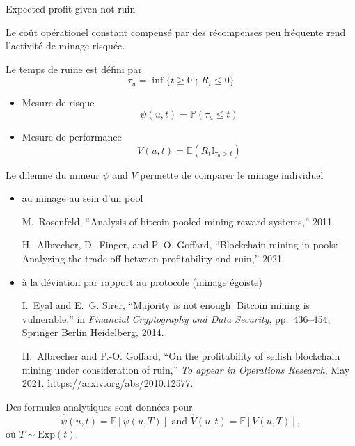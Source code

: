 \documentclass{beamer}
\begin{document}
\begin{frame}{Expected profit given not ruin}
\scriptsize

\begin{tcolorbox}[enhanced,drop shadow, title=Remarque]
Le coût opérationel constant compensé par des récompenses peu fréquente rend l'activité de minage risquée.
\end{tcolorbox}
Le temps de ruine est défini par
$$
\tau_u  = \inf\{t\geq0\text{ ; }R_t \leq0\}
$$
\begin{itemize}
  \item Mesure de risque
  $$
  \psi(u,t) = \mathbb{P}(\tau_u \leq t)
  $$
  \item Mesure de performance
  $$
  V(u,t) = \mathbb{E}(R_t\mathbb{I}_{\tau_u > t})
  $$
\end{itemize} 
\end{frame}
\begin{frame}{Le dilemne du mineur} 
\scriptsize
$\psi$ and $V$ permette de comparer le minage individuel
\begin{itemize}
  \item au minage au sein d'un pool
\tiny
  \begin{thebibliography}{1}

M.~Rosenfeld, ``Analysis of bitcoin pooled mining reward systems,'' 2011.

H.~Albrecher, D.~Finger, and P.-O. Goffard, ``Blockchain mining in pools:
  Analyzing the trade-off between profitability and ruin,'' 2021.


\end{thebibliography}
  \item \scriptsize à la déviation par rapport au protocole (minage égoïste)

  \tiny
  \begin{thebibliography}{1}
I.~Eyal and E.~G. Sirer, ``Majority is not enough: Bitcoin mining is
  vulnerable,'' in {\em Financial Cryptography and Data Security},
  pp.~436--454, Springer Berlin Heidelberg, 2014.

H.~Albrecher and P.-O. Goffard, ``{On the profitability of selfish blockchain
  mining under consideration of ruin},'' {\em To appear in Operations
  Research}, May 2021.
\newblock \url{https://arxiv.org/abs/2010.12577}.
\end{thebibliography}
\end{itemize}
Des formules analytiques sont données pour 
$$
\widehat{\psi}(u,t)= \mathbb{E}[\psi(u,T)]\text{ and }\widehat{V}(u,t)= \mathbb{E}[V(u,T)],
$$
où $T\sim\text{Exp}(t)$.
\end{frame}
\end{document}
